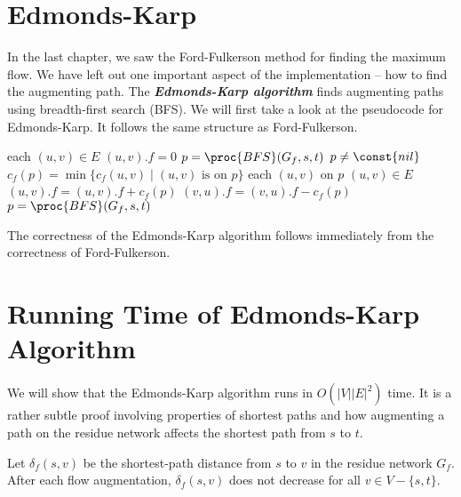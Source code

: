 \section{Edmonds-Karp} 

In the last chapter, we saw the Ford-Fulkerson method for finding the maximum flow. We have left out one important aspect of the implementation -- how to find the augmenting path. The \textit{\textbf{Edmonds-Karp algorithm}} finds augmenting paths using breadth-first search (BFS). We will first take a look at the pseudocode for Edmonds-Karp. It follows the same structure as Ford-Fulkerson.

\begin{codebox}
    \li \For each $(u,v) \in E$ \Do
        \li $(u,v).f = 0$ 
    \End
    \li $p = \proc{BFS}(G_f, s, t)$ 
    \li \While $p \neq \const{nil}$ \Do
        \li $c_f(p) = \min \{c_f(u,v) \mid \text{$(u,v)$ is on $p$} \}$ 
        \li \For each $(u,v)$ on $p$ \Do {}
            \li \If $(u,v) \in E$ \Then
                \li $(u,v).f = (u,v).f + c_f(p)$
            \li \Else $(v,u).f = (v,u).f - c_f(p)$
            \End
        \End
        \li $p = \proc{BFS}(G_f,s,t)$ 
    \End
\end{codebox}

The correctness of the Edmonds-Karp algorithm follows immediately from the correctness of Ford-Fulkerson.

\section{Running Time of Edmonds-Karp Algorithm}

We will show that the Edmonds-Karp algorithm runs in $O(|V||E|^2)$ time. It is a rather subtle proof involving properties of shortest paths and how augmenting a path on the residue network affects the shortest path from $s$ to $t$.

\begin{lemma} \label{lem:edmondskarp-runtime-1}
    Let $\delta_f(s,v)$ be the shortest-path distance from $s$ to $v$ in the residue network $G_f$. After each flow augmentation, $\delta_f(s,v)$ does not decrease for all $v \in V - \{s,t\}$.
\end{lemma}

